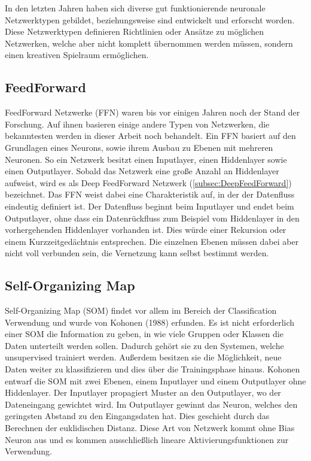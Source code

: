 In den letzten Jahren haben sich diverse gut funktionierende neuronale Netzwerktypen gebildet, beziehungsweise sind entwickelt und erforscht worden. 
Diese Netzwerktypen definieren Richtlinien oder Ansätze zu möglichen Netzwerken, welche aber nicht komplett übernommen werden müssen, sondern einen kreativen Spielraum ermöglichen. \\

\subsection{FeedForward}
\label{subsec:FeedForward}

FeedForward Netzwerke (FFN) waren bis vor einigen Jahren noch der Stand der Forschung.
Auf ihnen basieren einige andere Typen von Netzwerken, die bekanntesten werden in dieser Arbeit noch behandelt.
Ein FFN basiert auf den Grundlagen eines Neurons, sowie ihrem Ausbau zu Ebenen mit mehreren Neuronen.
So ein Netzwerk besitzt einen Inputlayer, einen Hiddenlayer sowie einen Outputlayer.
Sobald das Netzwerk eine große Anzahl an Hiddenlayer aufweist, wird es als Deep FeedForward Netzwerk (\ref{subsec:DeepFeedForward}) bezeichnet.
Das FFN weist dabei eine Charakteristik auf, in der der Datenfluss eindeutig definiert ist. 
Der Datenfluss beginnt beim Inputlayer und endet beim Outputlayer, ohne dass ein Datenrückfluss zum Beispiel vom Hiddenlayer in den vorhergehenden Hiddenlayer vorhanden ist.
Dies würde einer Rekursion oder einem Kurzzeitgedächtnis entsprechen.
Die einzelnen Ebenen müssen dabei aber nicht voll verbunden sein, die Vernetzung kann selbst bestimmt werden.

\subsection{Self-Organizing Map}
\label{subsec:SelfOrganizingMap}

Self-Organizing Map (SOM) findet vor allem im Bereich der Classification Verwendung und wurde von Kohonen (1988) erfunden. 
Es ist nicht erforderlich einer SOM die Information zu geben, in wie viele Gruppen oder Klassen die Daten unterteilt werden sollen. 
Dadurch gehört sie zu den Systemen, welche unsupervised trainiert werden. 
Außerdem besitzen sie die Möglichkeit, neue Daten weiter zu klassifizieren und dies über die Trainingsphase hinaus. 
Kohonen entwarf die SOM mit zwei Ebenen, einem Inputlayer und einem Outputlayer ohne Hiddenlayer. 
Der Inputlayer propagiert Muster an den Outputlayer, wo der Dateneingang gewichtet wird. 
Im Outputlayer gewinnt das Neuron, welches den geringsten Abstand zu den Eingangsdaten hat.
Dies geschieht durch das Berechnen der euklidischen Distanz. 
Diese Art von Netzwerk kommt ohne Bias Neuron aus und es kommen ausschließlich lineare Aktivierungsfunktionen zur Verwendung.


